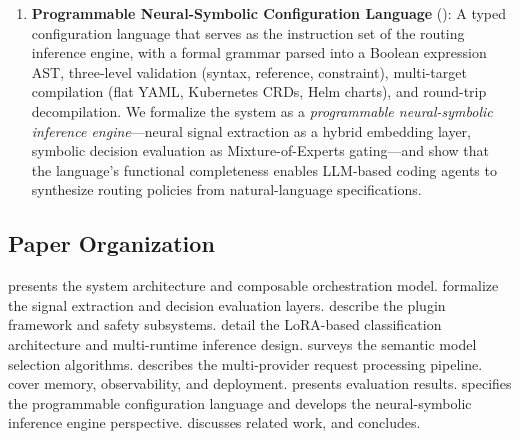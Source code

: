 \begin{enumerate}[leftmargin=*]
  \item \textbf{Programmable Neural-Symbolic Configuration Language} ():
    A typed configuration language that serves as the instruction set of the routing inference engine, with a formal grammar parsed into a Boolean expression AST, three-level validation (syntax, reference, constraint), multi-target compilation (flat YAML, Kubernetes CRDs, Helm charts), and round-trip decompilation.
    We formalize the system as a \emph{programmable neural-symbolic inference engine}---neural signal extraction as a hybrid embedding layer, symbolic decision evaluation as Mixture-of-Experts gating---and show that the language's functional completeness enables LLM-based coding agents to synthesize routing policies from natural-language specifications.
\end{enumerate}

\subsection{Paper Organization}

 presents the system architecture and composable orchestration model.
 formalize the signal extraction and decision evaluation layers.
 describe the plugin framework and safety subsystems.
 detail the LoRA-based classification architecture and multi-runtime inference design.
 surveys the semantic model selection algorithms.
 describes the multi-provider request processing pipeline.
 cover memory, observability, and deployment.
 presents evaluation results.
 specifies the programmable configuration language and develops the neural-symbolic inference engine perspective.
 discusses related work, and  concludes.
